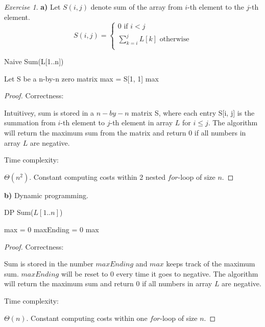 \documentclass[a4paper,10pt,twoside]{article}
\theoremstyle{plain}
\theoremstyle{definition}
\theoremstyle{remark}
\newtheorem{exercise}{Exercise}
\begin{document}
\begin{exercise}
\textbf{a)}
Let $S(i, j)$ denote sum of the array from $i$-th element to the $j$-th element.
\[
	S(i, j) = \begin{cases}
		0 \text{ if $i < j$}\\
		\sum_{k=i}^j L[k] \text{ otherwise}\\
		\end{cases}
\]
\begin{algorithm}[h]
	\caption{Naive Sum(L[1..n])}
	Let S be a n-by-n zero matrix\;
	max = S[1, 1]
	\Return max
\end{algorithm}
\begin{proof}

Correctness: 

Intuitivey, sum is stored in a $n-by-n$ matrix S, where each entry S[i, j] is the summation from $i$-th element to $j$-th element in array $L$ for $i \leq j$. The algorithm will return the maximum sum from the matrix and return 0 if all numbers in array $L$ are negative.

Time complexity:

$\Theta(n^2)$. Constant computing costs within 2 nested $for$-loop of size $n$. 

\end{proof}
\textbf{b)} 
Dynamic programming.
\begin{algorithm}[h]
	\caption{DP Sum($L[1..n]$)}
	max = 0\;
    	maxEnding = 0\;
	\Return max

\end{algorithm}

\begin{proof}

Correctness: 

Sum is stored in the number $maxEnding$ and $max$ keeps track of the maximum sum.  $maxEnding$ will be reset to $0$ every time it goes to negative. 
The algorithm will return the maximum sum and return 0 if all numbers in array $L$ are negative.

Time complexity:

$\Theta(n)$. Constant computing costs within one $for$-loop of size $n$. 

\end{proof}
\end{exercise}
\end{document}
